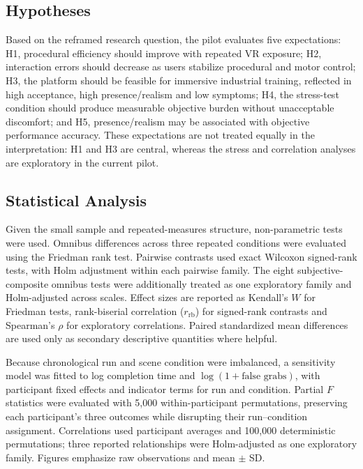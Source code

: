 \documentclass[a4paper,twoside]{article}
\begin{document}
\subsection{Hypotheses}

Based on the reframed research question, the pilot evaluates five expectations: H1, procedural efficiency should improve with repeated VR exposure; H2, interaction errors should decrease as users stabilize procedural and motor control; H3, the platform should be feasible for immersive industrial training, reflected in high acceptance, high presence/realism and low symptoms; H4, the stress-test condition should produce measurable objective burden without unacceptable discomfort; and H5, presence/realism may be associated with objective performance accuracy. These expectations are not treated equally in the interpretation: H1 and H3 are central, whereas the stress and correlation analyses are exploratory in the current pilot.

\subsection{Statistical Analysis}

Given the small sample and repeated-measures structure, non-parametric tests were used. Omnibus differences across three repeated conditions were evaluated using the Friedman rank test. Pairwise contrasts used exact Wilcoxon signed-rank tests, with Holm adjustment within each pairwise family. The eight subjective-composite omnibus tests were additionally treated as one exploratory family and Holm-adjusted across scales. Effect sizes are reported as Kendall's $W$ for Friedman tests, rank-biserial correlation ($r_{\mathrm{rb}}$) for signed-rank contrasts and Spearman's $\rho$ for exploratory correlations. Paired standardized mean differences are used only as secondary descriptive quantities where helpful.

Because chronological run and scene condition were imbalanced, a sensitivity model was fitted to log completion time and $\log(1+\text{false grabs})$, with participant fixed effects and indicator terms for run and condition. Partial $F$ statistics were evaluated with 5,000 within-participant permutations, preserving each participant's three outcomes while disrupting their run--condition assignment. Correlations used participant averages and 100,000 deterministic permutations; three reported relationships were Holm-adjusted as one exploratory family. Figures emphasize raw observations and mean $\pm$ SD.
\end{document}
